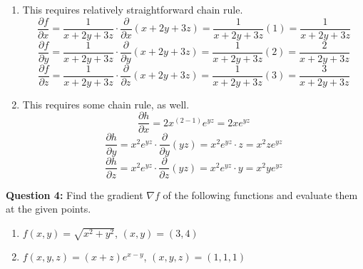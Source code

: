 \documentclass[10pt]{amsart}
\begin{document}
\begin{enumerate}
\item This requires relatively straightforward chain rule.
$$\frac{\partial f}{\partial x} = \frac{1}{x+2y+3z} \cdot \frac{\partial}{\partial x}(x+2y+3z) =
\frac{1}{x+2y+3z}(1) = \frac{1}{x+2y+3z}$$
$$\frac{\partial f}{\partial y} = \frac{1}{x+2y+3z} \cdot \frac{\partial}{\partial y}(x+2y+3z) =
\frac{1}{x+2y+3z}(2) = \frac{2}{x+2y+3z}$$
$$\frac{\partial f}{\partial z} = \frac{1}{x+2y+3z} \cdot \frac{\partial}{\partial z}(x+2y+3z) =
\frac{1}{x+2y+3z}(3) = \frac{3}{x+2y+3z}$$

\item This requires some chain rule, as well.
$$\frac{\partial h}{\partial x} = 2x^{(2-1)}e^{yz} = 2xe^{yz}$$
$$\frac{\partial h}{\partial y} = x^2 e^{yz} \cdot \frac{\partial}{\partial y}(yz) = x^2 e^{yz} \cdot z = x^2 z e^{yz}$$
$$\frac{\partial h}{\partial z} = x^2 e^{yz} \cdot \frac{\partial}{\partial z}(yz) = x^2 e^{yz} \cdot y = x^2 y e^{yz}$$

\end{enumerate}
\medskip

\textbf{Question 4:} Find the gradient $\nabla f$ of the following functions and evaluate them at the given points.
\begin{enumerate}
\item $f(x,y) = \sqrt{x^2 + y^2}$, \quad $(x,y) = (3,4)$
\item $f(x,y,z) = (x+z)e^{x-y}$, \quad $(x,y,z) = (1,1,1)$
\end{enumerate}
\end{document}
